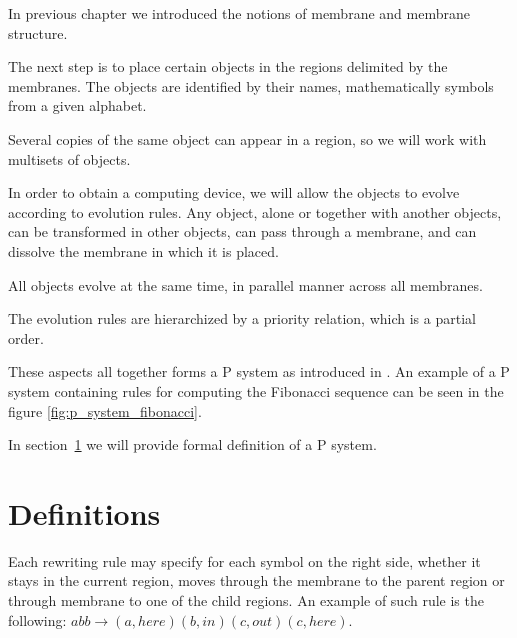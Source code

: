 In previous chapter we introduced the notions of membrane and membrane structure.


The next step is to place certain objects in the regions delimited by the membranes. The objects are identified by their names, mathematically symbols from a given alphabet.


Several copies of the same object can appear in a region, so we will work with multisets of objects.


In order to obtain a computing device, we will allow the objects to evolve according to evolution rules. Any object, alone or together with another objects, can be transformed in other objects, can pass through a membrane, and can dissolve the membrane in which it is placed.


All objects evolve at the same time, in parallel manner across all membranes.


The evolution rules are hierarchized by a priority relation, which is a partial order.


These aspects all together forms a P system as introduced in \cite{Paun98}. An example of a P system containing rules for computing the Fibonacci sequence can be seen in the figure \ref{fig:p_system_fibonacci}.


In section~\ref{sec:definitions} we will provide formal definition of a P system.

\section{Definitions} %
\label{sec:definitions}




Each rewriting rule may specify for each symbol on the right side, whether it stays in the current region, moves through the membrane to the parent region or through membrane to one of the child regions. An example of such rule is the following: $abb\rightarrow (a,here)(b,in)(c,out)(c,here)$.




